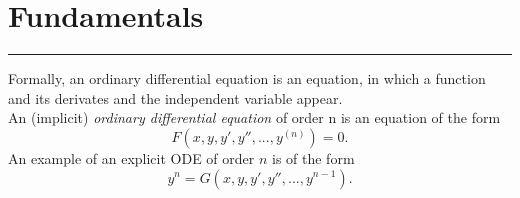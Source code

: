 \section{Fundamentals}
\noindent\rule[\linienAbstand]{\linewidth}{\linienDickeDick}
Formally, an ordinary differential equation is an equation, in which a function and its derivates and the independent variable appear.\\

An (implicit) \emph{ordinary differential equation} of order n is an equation of the form
\begin{equation}
  F(x, y, y', y'', ..., y^{(n)}) = 0.
\end{equation}
An example of an explicit ODE of order $n$ is of the form
\begin{equation}
  y^{n} = G(x, y, y', y'', ..., y^{n-1}).
\end{equation}
